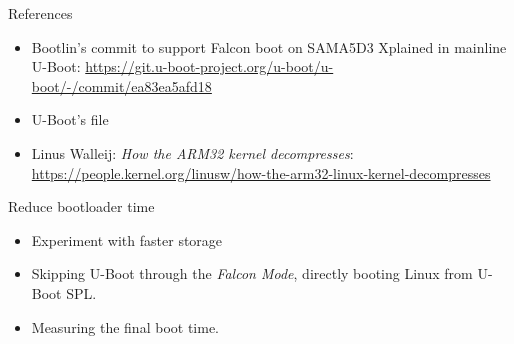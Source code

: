\begin{frame}{References}
   \begin{itemize}
      \item Bootlin's commit to support Falcon boot on SAMA5D3 Xplained in mainline U-Boot:
	    {\small \url{https://git.u-boot-project.org/u-boot/u-boot/-/commit/ea83ea5afd18}}
      \item U-Boot's  file
      \item Linus Walleij: {\em How the ARM32 kernel decompresses}:\\
	    \small\url{https://people.kernel.org/linusw/how-the-arm32-linux-kernel-decompresses}
   \end{itemize}
\end{frame}

\setuplabframe
{Reduce bootloader time}
{
\begin{itemize}
\item Experiment with faster storage
\item Skipping U-Boot through the {\em Falcon Mode}, directly booting
      Linux from U-Boot SPL.
\item Measuring the final boot time.
\end{itemize}
}

